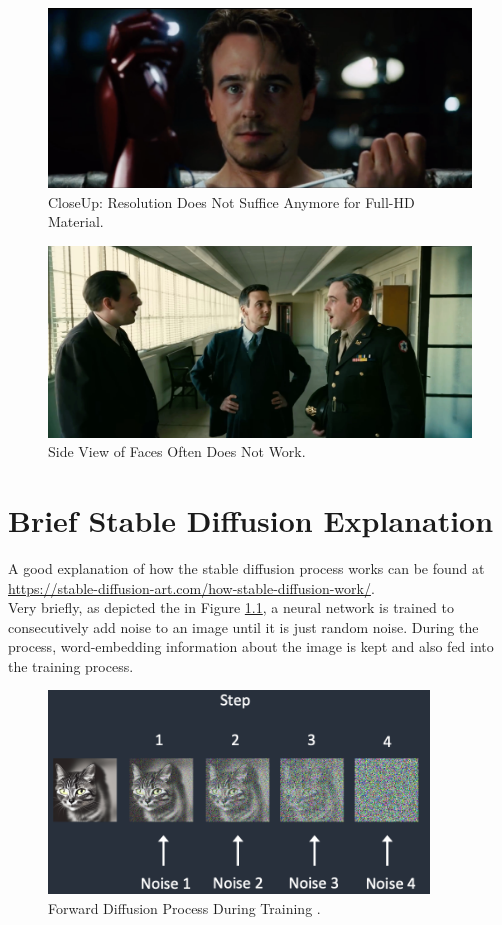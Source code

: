 \documentclass[
  a4paper,  %
  twoside,  %
  bibliography=totoc,
  headsepline,
  cleardoublepage=empty,
  parskip=half,
  draft=false
]{scrbook}
\begin{document}
\begin{figure}[h]
  \centering
  \includegraphics[width=1\textwidth]{./graphics/inswapper/iron-man-too-close.png}
  \caption{CloseUp: Resolution Does Not Suffice Anymore for Full-HD Material.}
\end{figure}
\begin{figure}[h]
  \centering
  \includegraphics[width=1\textwidth]{./graphics/inswapper/oppenheimer1.png}
  \caption{Side View of Faces Often Does Not Work.}
\end{figure}

\chapter{Brief Stable Diffusion Explanation}
\label{app:diff-workflow}
A good explanation of how the stable diffusion process works can be found at \url{https://stable-diffusion-art.com/how-stable-diffusion-work/}. \\
Very briefly, as depicted the in Figure \ref{fig:forward-diff}, a neural network is trained to consecutively add noise to an image until it is just random noise. During the process, word-embedding information about the image is kept and also fed into the training process.
\begin{figure}[h]
  \centering
  \includegraphics[width=0.9\textwidth]{./graphics/forward-diff.png}
  \caption{Forward Diffusion Process During Training \cite{andrewHowDoesStable2022}.}
  \label{fig:forward-diff}
\end{figure}
\end{document}
